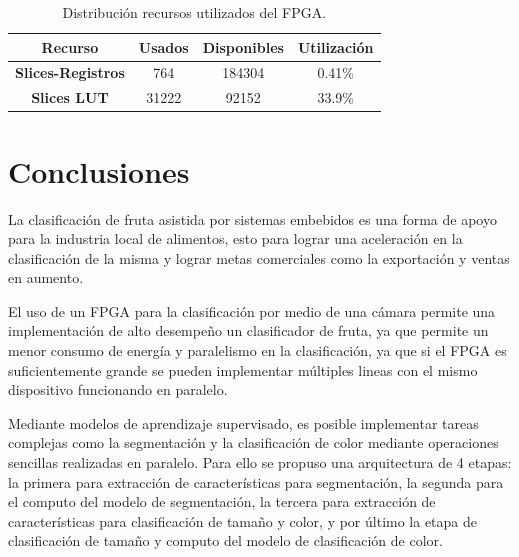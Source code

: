 \documentclass[twoside,spanish,ESP,MSc]{plantillaLabUPV}
\theoremstyle{definition}
\begin{document}
\begin{table}[!tbh]
	\caption{Distribución recursos utilizados del FPGA.}
	\label{resources}
	\centering
	\begin{tabular}{|c|c|c|c|}
		\hline
		\textbf{Recurso}          & \textbf{Usados} & \textbf{Disponibles} & \textbf{Utilización} \\ \hline
		\textbf{Slices-Registros} & 764             & 184304               & 0.41\%               \\ \hline
		\textbf{Slices LUT}       & 31222           & 92152                & 33.9\%               \\ \hline
	\end{tabular}
\end{table}


\chapter{Conclusiones}

La clasificación de fruta asistida por sistemas embebidos es una forma de apoyo para la industria local de alimentos, esto para lograr una aceleración en la clasificación de la misma y lograr metas comerciales como la exportación y ventas en aumento.


El uso de un FPGA para la clasificación por medio de una cámara permite una implementación de alto desempeño un clasificador de fruta, ya que permite un menor consumo de energía y paralelismo en la clasificación, ya que si el FPGA es suficientemente grande se pueden implementar múltiples lineas con el mismo dispositivo funcionando en paralelo.


Mediante modelos de aprendizaje supervisado, es posible implementar tareas complejas como la segmentación y la clasificación de color mediante operaciones sencillas realizadas en paralelo. Para ello se propuso una arquitectura de 4 etapas: la primera para extracción de características para segmentación, la segunda para el computo del modelo de segmentación, la tercera para extracción de características para clasificación de tamaño y color, y por último la etapa de clasificación de tamaño y computo del modelo de clasificación de color.
\end{document}
